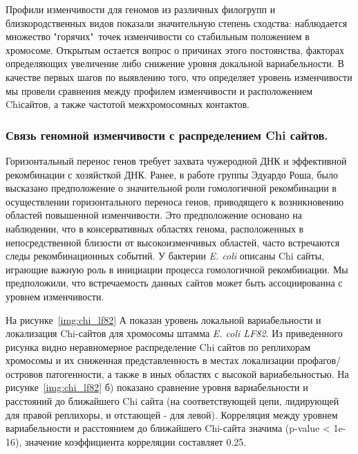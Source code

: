 Профили изменчивости для геномов из различных филогрупп и близкородственных видов показали значительную степень сходства: наблюдается множество "горячих"\ точек изменчивости со стабильным положением в хромосоме. Открытым остается вопрос о причинах этого постоянства, факторах определяющих увеличение либо снижение уровня докальной вариабельности. В качестве первых шагов по выявлению того, что определяет уровень изменчивости мы провели сравнения между профилем изменчивости и расположением Chi\-сайтов, а также частотой межхромосомных контактов. 

\subsubsection*{Связь геномной изменчивости с распределением Chi сайтов.}
Горизонтальный перенос генов требует захвата чужеродной ДНК и эффективной рекомбинации с хозяйсткой ДНК. Ранее, в работе группы Эдуардо Роша, было высказано предположение о значительной роли гомологичной рекомбинации в осуществлении горизонтального переноса генов, приводящего к возникновению областей повышенной изменчивости. Это предположение основано на наблюдении, что в консервативных областях генома, расположенных в непосредственной близости от высокоизменчивых областей, часто встречаются следы рекомбинационных событий. У бактерии \textit{E. coli} описаны Chi сайты, играющие важную роль в инициации процесса гомологичной рекомбинации. Мы предположили, что встречаемость данных сайтов может быть ассоциированна с уровнем изменчивости.

На рисунке~\ref{img:chi_lf82} А показан уровень локальной вариабельности и локализация Chi-сайтов для хромосомы штамма \textit{E. coli LF82}. Из приведенного рисунка видно неравномерное распределение Chi сайтов по реплихорам хромосомы и их сниженная представленность в местах локализации профагов/островов патогенности, а также в иных областях с высокой вариабельностью. На рисунке~\ref{img:chi_lf82} б) показано сравнение уровня вариабельности и расстояний до ближайшего Chi сайта (на соответствующей цепи, лидирующей для правой реплихоры, и отстающей - для левой). Корреляция между уровнем вариабельности и расстоянием до ближайшего Chi-сайта значима (p-value < 1e-16), значение коэффициента корреляции составляет 0.25.

